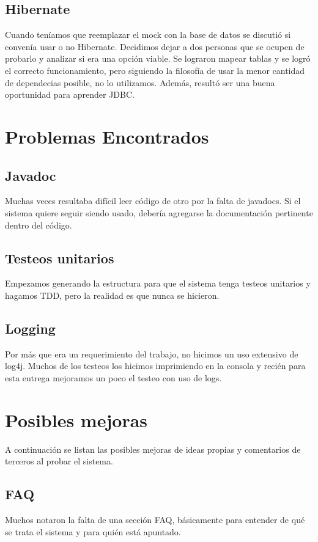 \documentclass[a4paper,11pt]{article}
\begin{document}
\subsection{Hibernate}
Cuando teníamos que reemplazar el mock con la base de datos se discutió
si convenía usar o no Hibernate. Decidimos dejar a dos personas que se ocupen
de probarlo y analizar si era una opción viable. Se lograron mapear tablas y
se logró el correcto funcionamiento, pero siguiendo la filosofía de usar la menor
cantidad de dependecias posible, no lo utilizamos. Además, resultó ser una buena
oportunidad para aprender JDBC.

\section{Problemas Encontrados}
\subsection{Javadoc}
Muchas veces resultaba difícil leer código de otro por la falta de javadocs.
Si el sistema quiere seguir siendo usado, debería agregarse la documentación
pertinente dentro del código.

\subsection{Testeos unitarios}
Empezamos generando la estructura para que el sistema tenga testeos unitarios
y hagamos TDD, pero la realidad es que nunca se hicieron.

\subsection{Logging}
Por más que era un requerimiento del trabajo, no hicimos un uso extensivo de log4j.
Muchos de los testeos los hicimos imprimiendo en la consola y recién para esta entrega mejoramos
un poco el testeo con uso de logs.

\section{Posibles mejoras}
A continuación se listan las posibles mejoras de ideas propias y comentarios
de terceros al probar el sistema.

\subsection{FAQ}
Muchos notaron la falta de una sección FAQ, básicamente para entender de qué
se trata el sistema y para quién está apuntado.
\end{document}
